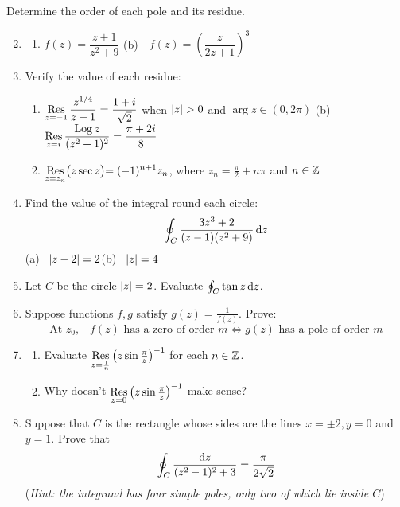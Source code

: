 \begin{exercises}
	\exstart Determine the order of each pole and its residue.
	\begin{enumerate}\setcounter{enumi}{1}
	  \item[]\begin{enumerate}
	    \item $f(z)=\dfrac{z+1}{z^2+9}$\qquad\qquad
	    (b)\ \ $f(z)=\left(\dfrac{z}{2z+1}\right)^3$
	  \end{enumerate}
	  
	  
	  \item Verify the value of each residue:
	  \begin{enumerate}\itemsep4pt
	    \item $\displaystyle\operatorname*{Res}\limits_{z=-1}\frac{z^{1/4}}{z+1}=\frac{1+i}{\sqrt 2}$ when $\nm z>0$ and $\arg z\in(0,2\pi)$
	    \qquad\qquad
	    (b) \  $\displaystyle\operatorname*{Res}\limits_{z=i}\frac{\operatorname{Log} z}{(z^2+1)^2}=\frac{\pi+2i}8$
	    \setcounter{enumii}{2}
	    
	    \item $\displaystyle\operatorname*{Res}\limits_{z=z_n}\bigl(z\sec z\bigl)=(-1)^{n+1}z_n$, where $z_n=\frac\pi 2+n\pi$ and $n\in\mathbb{Z}$
	  \end{enumerate}
	  
	  
	  \item Find the value of the integral round each circle:
	  \[
	  	\oint_C\frac{3z^3+2}{(z-1)(z^2+9)}\,{\mathrm{d} z}
	  \]
	 	(a) \ $\left| z-2\right|=2$\qquad\qquad (b) \ $\left| z\right|=4$
	  
	  
	  \item Let $C$ be the circle $\left| z\right|=2$. Evaluate $\oint_C\tan z\,{\mathrm{d} z}$.
	  
	  
	  \item Suppose functions $f,g$ satisfy $g(z)=\frac 1{f(z)}$. Prove:
		\[
			\text{At $z_0$,}\quad f(z)\text{ has a zero of order $m$}\iff g(z)\text{ has a pole of order $m$}
		\] 

	  
	  \item\begin{enumerate}
	    \item Evaluate $\operatorname*{Res}\limits_{z=\frac 1n}\left(z\sin\frac\pi z\right)^{-1}$ for each $n\in\mathbb{Z}$.
	    \item Why doesn't $\operatorname*{Res}\limits_{z=0}\left(z\sin\frac\pi z\right)^{-1}$ make sense?
	  \end{enumerate}
		
	  	  
	  \item Suppose that $C$ is the rectangle whose sides are the lines $x=\pm 2, y=0$ and $y=1$. Prove that
	  \[
	  	\oint_C\frac{{\mathrm{d} z}}{(z^2-1)^2+3}=\frac\pi{2\sqrt 2}
	  \]
	  (\emph{Hint: the integrand has four simple poles, only two of which lie inside $C$})
	  

\end{enumerate}
\end{exercises}
